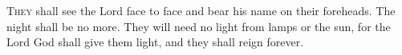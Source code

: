 \lettrine[loversize=0.15,lines=2]{T}{hey} shall see the Lord face to face and bear his name on their foreheads. The night shall be no more. They will need no light from lamps or the sun, for the Lord God shall give them light, and they shall reign forever.
